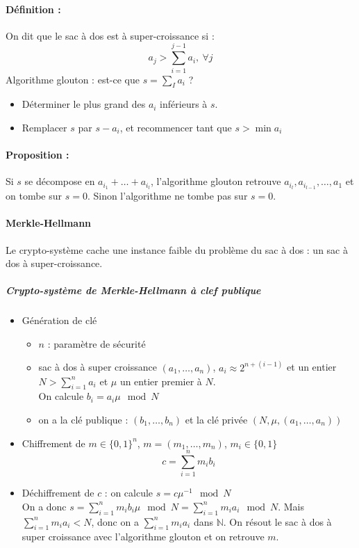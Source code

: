 \documentclass[12pt,a4paper]{report}
\begin{document}
\paragraph{Définition :\\}
On dit que le sac à dos est à super-croissance si :
$$ a_j> \sum_{i=1}^{j-1} a_i,\ \forall j $$
Algorithme glouton : est-ce que $s=\sum_{I} a_i$ ?
\begin{itemize}
\item Déterminer le plus grand des $a_i$ inférieurs à $s$.
\item Remplacer $s$ par $s-a_i$, et recommencer tant que $s > \min a_i$
\end{itemize}
\paragraph{Proposition :\\}
Si $s$ se décompose en $a_{i_1} + \ldots + a_{i_l}$, l'algorithme glouton re\-trouve $a_{i_l},a_{i_{l-1}}, \ldots, a_1$ et on tombe sur $s=0$. Sinon l'algorithme ne tombe pas sur $s=0$.
\paragraph{Merkle-Hellmann}
Le crypto-système cache une instance faible du problème du sac à dos : un sac à dos à super-croissance.
\subparagraph{Crypto-système de Merkle-Hellmann à clef publique\\}
\begin{itemize}
\item Génération de clé 
\begin{itemize}
\item $n$ : paramètre de sécurité
\item sac à dos à super croissance $(a_1,\ldots,a_n)$, $a_i \approx 2^{n+(i-1)}$ et un entier $N >\displaystyle \sum_{i=1}^n a_i $ et $\mu$ un entier premier à $N$. \\
On calcule $b_i = a_i \mu \mod N$
\item on a la clé publique : $(b_1,\ldots,b_n)$ et la clé privée $(N,\mu,(a_1,\ldots,a_n))$
\end{itemize}
\item Chiffrement de $m \in \{0,1\}^n$, $m=(m_1,\ldots,m_n)$, $m_i \in \{0,1\}$\\
$$ c = \sum_{i=1}^n m_i b_i $$
\item Déchiffrement de $c$ : on calcule $s=c\mu^{-1} \mod N$\\
On a donc $ s = \displaystyle  \sum_{i=1}^n m_i b_i \mu \mod N =   \displaystyle  \sum_{i=1}^n m_i a_i \mod N $. Mais $  \displaystyle  \sum_{i=1}^n m_i a_i < N$, donc on a $  \displaystyle  \sum_{i=1}^n m_i a_i$ dans $\mathbb{N}$. On résout le sac à dos à super croissance avec l'algorithme glouton et on retrouve $m$.
\end{itemize}
\end{document}
